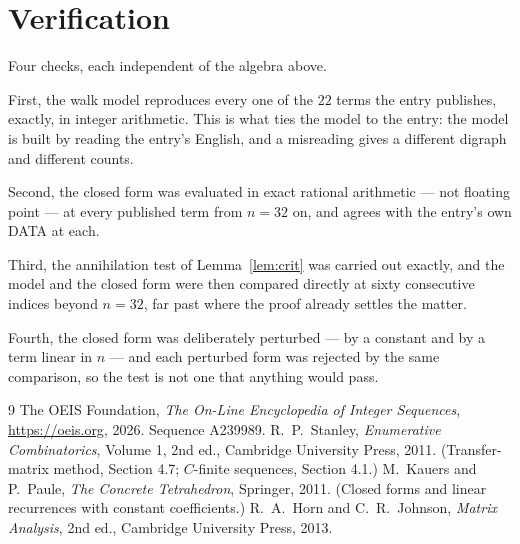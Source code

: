 \documentclass[11pt,a4paper]{article}
\theoremstyle{plain}
\theoremstyle{definition}
\begin{document}
\section{Verification}

Four checks, each independent of the algebra above.

First, the walk model reproduces every one of the $22$ terms the entry publishes,
exactly, in integer arithmetic. This is what ties the model to the entry: the model is built
by reading the entry's English, and a misreading gives a different digraph and different
counts.

Second, the closed form was evaluated in exact rational arithmetic --- not floating point ---
at every published term from $n=32$ on, and agrees with the entry's own DATA at each.

Third, the annihilation test of Lemma~\ref{lem:crit} was carried out exactly, and the model
and the closed form were then compared directly at sixty consecutive indices beyond
$n=32$, far past where the proof already settles the matter.

Fourth, the closed form was deliberately perturbed --- by a constant and by a term linear in
$n$ --- and each perturbed form was rejected by the same comparison, so the test is not one
that anything would pass.

\begin{thebibliography}{9}
 The OEIS Foundation, \emph{The On-Line Encyclopedia of Integer
Sequences}, \url{https://oeis.org}, 2026. Sequence A239989.
 R.~P.~Stanley, \emph{Enumerative Combinatorics}, Volume 1, 2nd ed.,
Cambridge University Press, 2011. (Transfer-matrix method, Section 4.7; $C$-finite sequences,
Section 4.1.)
 M.~Kauers and P.~Paule, \emph{The Concrete Tetrahedron}, Springer, 2011.
(Closed forms and linear recurrences with constant coefficients.)
 R.~A.~Horn and C.~R.~Johnson, \emph{Matrix Analysis}, 2nd ed., Cambridge
University Press, 2013.
\end{thebibliography}
\end{document}
